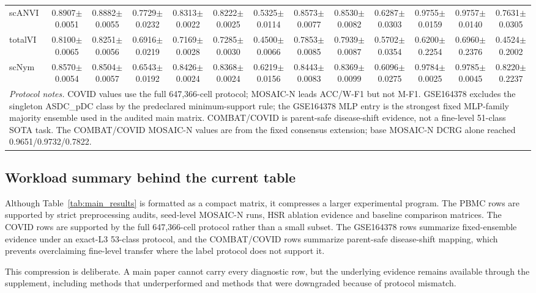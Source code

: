 \documentclass[unnumsec,webpdf,contemporary,large,numbered]{oup-authoring-template}
\begin{document}
\begin{table}[t]
{\begin{tabular}{p{1.9cm}cccccccccccc}
scANVI & 0.8907$\pm$0.0051 & 0.8882$\pm$0.0055 & 0.7729$\pm$0.0232 & 0.8313$\pm$0.0022 & 0.8222$\pm$0.0025 & 0.5325$\pm$0.0114 & 0.8573$\pm$0.0077 & 0.8530$\pm$0.0082 & 0.6287$\pm$0.0303 & 0.9755$\pm$0.0159 & 0.9757$\pm$0.0140 & 0.7631$\pm$0.0305 \\
totalVI & 0.8100$\pm$0.0065 & 0.8251$\pm$0.0056 & 0.6916$\pm$0.0219 & 0.7169$\pm$0.0028 & 0.7285$\pm$0.0030 & 0.4500$\pm$0.0066 & 0.7853$\pm$0.0085 & 0.7939$\pm$0.0087 & 0.5702$\pm$0.0354 & 0.6200$\pm$0.2254 & 0.6960$\pm$0.2376 & 0.4524$\pm$0.2002 \\
scNym & 0.8570$\pm$0.0054 & 0.8504$\pm$0.0057 & 0.6543$\pm$0.0192 & 0.8426$\pm$0.0024 & 0.8368$\pm$0.0024 & 0.6219$\pm$0.0156 & 0.8443$\pm$0.0083 & 0.8369$\pm$0.0099 & 0.6096$\pm$0.0275 & 0.9784$\pm$0.0025 & 0.9785$\pm$0.0045 & 0.8220$\pm$0.2237 \\
\midrule
\multicolumn{13}{p{21.0cm}}{\textit{Protocol notes.} COVID values use the full 647,366-cell protocol; MOSAIC-N leads ACC/W-F1 but not M-F1. GSE164378 excludes the singleton ASDC\_pDC class by the predeclared minimum-support rule; the GSE164378 MLP entry is the strongest fixed MLP-family majority ensemble used in the audited main matrix. COMBAT/COVID is parent-safe disease-shift evidence, not a fine-level 51-class SOTA task. The COMBAT/COVID MOSAIC-N values are from the fixed consensus extension; base MOSAIC-N DCRG alone reached 0.9651/0.9732/0.7822.} \\
\bottomrule
\end{tabular}
}
\end{table}

\subsection{Workload summary behind the current table}

Although Table~\ref{tab:main_results} is formatted as a compact matrix, it compresses a larger experimental program. The PBMC rows are supported by strict preprocessing audits, seed-level MOSAIC-N runs, HSR ablation evidence and baseline comparison matrices. The COVID rows are supported by the full 647,366-cell protocol rather than a small subset. The GSE164378 rows summarize fixed-ensemble evidence under an exact-L3 53-class protocol, and the COMBAT/COVID rows summarize parent-safe disease-shift mapping, which prevents overclaiming fine-level transfer where the label protocol does not support it.

This compression is deliberate. A main paper cannot carry every diagnostic row, but the underlying evidence remains available through the supplement, including methods that underperformed and methods that were downgraded because of protocol mismatch.
\end{document}
